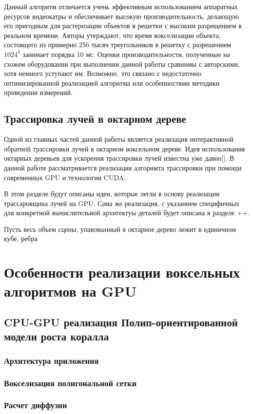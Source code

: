 \documentclass[a4paper,14pt]{extreport}
\begin{document}
Данный алгоритм отличается учень эффективным использованием аппаратных ресурсов видеокатры и обеспечивает высокую производительность, делающую его пригодным для растеризации объектов в решетки с высоким разрещением в реальном времени. Авторы утерждают, что время вокселизации объекта, состоящего из примерно 256 тысяч треугольников в решетку с разрешением $1024^3$ занимает порядка 10 мс. Оценки производительности, полученные на схожем оборудовании при выполнении данной работы сравнимы с авторскими, хотя немного уступают им. Возможно, это связано с недостаточно оптимизированной реализацией алгоритма или особенностями методики проведения измерений.

\section{Трассировка лучей в октарном дереве}

Одной из главных частей данной работы является реализация интерактивной обратной трассировки лучей в октарном воксельном дереве. Идея использования октарных деревьев для ускорения трассировки лучей известна уже давно[]. В данной работе рассматривается реализация алгоримта трассировки при помощи современных GPU и технологии CUDA.

В этом разделе будут описаны идеи, которые легли в основу реализации трассаровщика лучей на GPU. Сама же реализация, с указанием специфичных для конкретной вычислительной архитектуы деталей будет описана в разделе ++.

Пусть весь объем сцены, упаковынный в октарное дерево лежит в единичном кубе, ребра




\chapter{Особенности реализации воксельных алгоритмов на GPU}
\section{CPU-GPU реализация Полип-ориентированной модели роста коралла}
\subsection{Архитектура приложения}
\subsection{Вокселизация полигональной сетки}
\subsection{Расчет диффузии}
\end{document}
